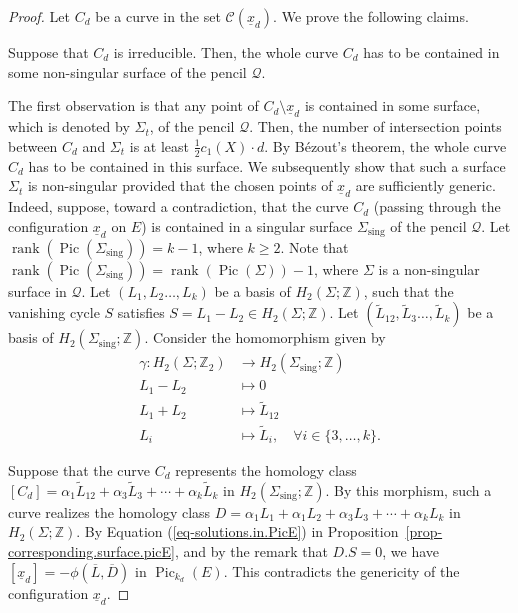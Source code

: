 \documentclass[10pt,a4paper]{article}
\numberwithin{equation}{section}
\theoremstyle{definition}
\theoremstyle{plain}
\theoremstyle{remark}
\newenvironment{claim}[1]{\renewcommand\theinnercustomclaim{#1}\innercustomclaim}{\endinnercustomclaim}
\newcommand{\Z}{\mathbb{Z}}
\DeclareMathOperator{\Pic}{Pic}
\DeclareMathOperator{\rank}{rank}
\newcommand{\sing}{\mathrm{sing}}
\newcommand{\lra}{\longrightarrow}
\begin{document}
 \begin{proof}
Let $C_d$ be a curve in the set $\mathcal{C}(\underline{x}_d)$. We prove the following claims.

\begin{claim}{1}\label{claim3.2-1}
Suppose that $C_d$ is irreducible. Then,  the whole curve $C_d$ has to be contained in some non-singular surface of the pencil $\mathcal{Q}$.
\end{claim}

The first observation is that any point of $C_d\setminus\underline{x}_d$ is contained in some  surface, which is denoted by $\Sigma_t$, of the pencil $\mathcal{Q}$. Then, the number of intersection points between $C_d$ and  $\Sigma_t$ is at least $\frac{1}{2}c_1(X)\cdot d$. By B\'ezout's theorem, the whole curve $C_d$ has to be contained in this surface. We subsequently show that such a surface $\Sigma_t$ is non-singular provided that the chosen points of $\underline{x}_d$ are sufficiently generic. Indeed, suppose, toward a contradiction, that the curve $C_d$ (passing through the configuration $\underline{x}_d$ on $E$) is contained in a singular surface $\Sigma_{\sing}$ of the pencil $\mathcal{Q}$. Let $\rank(\Pic(\Sigma_{\sing}))=k-1$, where  $k\geq 2$. Note that  $\rank(\Pic(\Sigma_{\sing}))=\rank(\Pic(\Sigma))-1$, where $\Sigma$ is a non-singular surface in $\mathcal{Q}$. Let $(L_1,L_2\ldots,L_k)$ be a basis of $ H_2(\Sigma;\Z)$, such that the vanishing cycle $S$ satisfies $S=L_1-L_2\in H_2(\Sigma;\Z)$. Let $(\tilde{L}_{12},\tilde{L}_3\ldots,\tilde{L}_k)$ be a basis of $ H_2(\Sigma_{\sing};\Z)$. Consider the  homomorphism given by
\begin{align*}
    \gamma\colon H_2(\Sigma;\Z_2)&\lra H_2(\Sigma_{\sing};\Z)\\
    L_1-L_2& \longmapsto 0 \\
    L_1+L_2& \longmapsto \tilde{L}_{12}\\
    L_i & \longmapsto \tilde{L}_i,\quad \forall i \in \{3,\ldots,k\}.
\end{align*}

Suppose that the curve $C_d$ represents the homology class $[C_d]=\alpha_{1}\tilde{L}_{12}+\alpha_3 \tilde{L}_3+\cdots + \alpha_k \tilde{L}_k$ in $H_2(\Sigma_{\sing};\Z)$. By this morphism, such a curve realizes the homology class $D=\alpha_{1}L_{1}+\alpha_1 L_2+\alpha_3 L_3+\cdots + \alpha_k L_k$ in $H_2(\Sigma;\Z)$. By Equation (\ref{eq-solutions.in.PicE}) in Proposition~\ref{prop-corresponding.surface.picE}, and by the remark that $D.S=0$, we have
$[\underline{x}_d]=-\phi (\overline{L},\overline{D})$ in $\Pic_{k_d}(E)$. This contradicts the genericity of the configuration $\underline{x}_d$. 


\end{proof}
\end{document}
